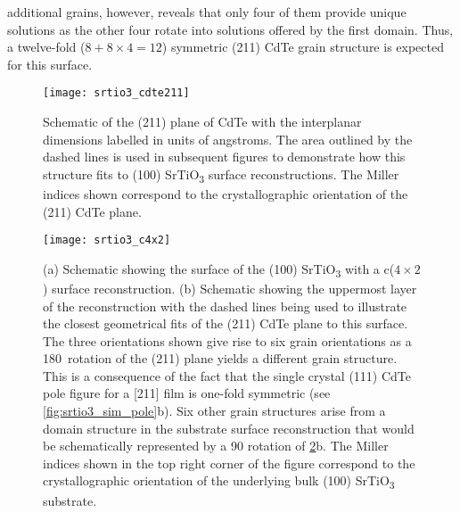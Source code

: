 additional grains, however, reveals that only four of them provide
unique solutions as the other four rotate into solutions offered by
the first domain. Thus, a twelve-fold ($8 + 8 \times 4 = 12$) symmetric
(211) CdTe grain structure is expected for this surface.
\begin{figure}
    \centering
    \texttt{[image: srtio3\_cdte211]}
    \caption[Projection of (211) CdTe unit cell on SrTiO\textsubscript{3} surface]{\label{fig:srtio3_cdte211}Schematic of the (211) plane of CdTe with the interplanar dimensions
        labelled in units of angstroms. The area outlined by the dashed lines is used in
        subsequent figures to demonstrate how this structure fits to (100) SrTiO\textsubscript{3} surface
        reconstructions. The Miller indices shown correspond to the crystallographic
        orientation of the (211) CdTe plane.}
\end{figure}
\begin{figure}
    \centering
    \texttt{[image: srtio3\_c4x2]}
    \caption[CdTe on c(4$\times$2) SrTiO\textsubscript{3} surface]{\label{fig:srtio3_c4x2}(a) Schematic showing the surface of the (100) SrTiO\textsubscript{3} with a c($4\times2$) surface reconstruction. (b) Schematic showing the uppermost layer of the reconstruction with the dashed lines being used to illustrate the closest geometrical fits of the (211) CdTe plane to this surface. The three orientations shown give rise to six grain orientations as a 180\degree~rotation of the (211) plane yields a different grain structure. This is a consequence of the fact that the single crystal (111) CdTe pole figure for a [211] film is one-fold symmetric (see \cref{fig:srtio3_sim_pole}b). Six other grain structures arise from a domain structure in the substrate surface reconstruction that would be schematically represented by a 90\degree{} rotation of \cref{fig:srtio3_c4x2}b. The Miller indices shown in the top right corner of the figure correspond to the crystallographic orientation of the underlying bulk (100) SrTiO\textsubscript{3} substrate.}
\end{figure}

